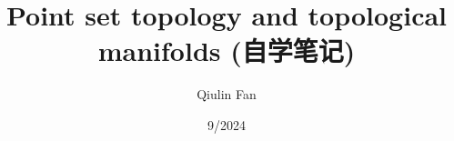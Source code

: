 \documentclass[12pt]{article}
\begin{document}
\title{Point set topology and topological manifolds (自学笔记)}

\author{%
   Qiulin Fan%
}

\date{9/2024}

\maketitle








\end{document}

